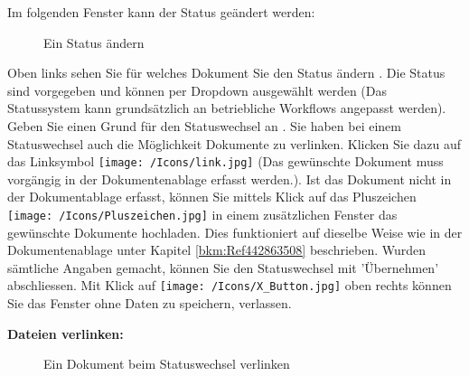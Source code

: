Im folgenden Fenster kann der Status geändert werden:

\begin{figure}[H]
\caption{Ein Status ändern}
\end{figure}

Oben links sehen Sie für welches Dokument Sie den Status ändern . Die Status sind vorgegeben und können per Dropdown ausgewählt werden  (Das Statussystem kann grundsätzlich an betriebliche Workflows angepasst werden). Geben Sie einen Grund für den Statuswechsel an . Sie haben bei einem Statuswechsel auch die Möglichkeit Dokumente zu verlinken. Klicken Sie dazu auf das Linksymbol \texttt{[image: /Icons/link.jpg]}  (Das gewünschte Dokument muss vorgängig in der Dokumentenablage erfasst werden.). Ist das Dokument nicht in der Dokumentablage erfasst, können Sie mittels Klick auf das Pluszeichen \texttt{[image: /Icons/Pluszeichen.jpg]}  in einem zusätzlichen Fenster das gewünschte Dokumente hochladen. Dies funktioniert auf dieselbe Weise wie in der Dokumentenablage unter Kapitel \ref{bkm:Ref442863508} beschrieben. Wurden sämtliche Angaben gemacht, können Sie den Statuswechsel mit 'Übernehmen'  abschliessen. Mit Klick auf \texttt{[image: /Icons/X\_Button.jpg]}  oben rechts können Sie das Fenster ohne Daten zu speichern, verlassen.

\vspace{\baselineskip}

\textbf{Dateien verlinken:}

\begin{figure}[H]
\caption{Ein Dokument beim Statuswechsel verlinken}
\end{figure}

